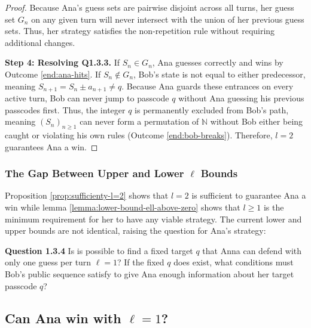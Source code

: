 \begin{proof}
Because Ana's guess sets are pairwise disjoint across all turns, her guess set $G_n$ on any given turn will never intersect with the union of her previous guess sets. Thus, her strategy satisfies the non-repetition rule without requiring additional changes.

\textbf{Step 4: Resolving Q1.3.3.} 
If $S_n \in G_n$, Ana guesses correctly and wins by Outcome \ref{end:ana-hits}. If $S_n \notin G_n$, Bob's state is not equal to either predecessor, meaning $S_{n+1} = S_n \pm a_{n+1} \neq q$. Because Ana guards these entrances on every active turn, Bob can never jump to passcode $q$ without Ana guessing his previous passcodes first. Thus, the integer $q$ is permanently excluded from Bob's path, meaning $(S_n)_{n \ge 1}$ can never form a permutation of $\mathbb{N}$ without Bob either being caught or violating his own rules (Outcome \ref{end:bob-breaks}). Therefore, $l=2$ guarantees Ana a win.
\end{proof}


\subsubsection*{The Gap Between Upper and Lower $\ell$ Bounds}
Proposition \ref{prop:sufficienty-l=2} shows that $l=2$ is sufficient to guarantee Ana a win while lemma \ref{lemma:lower-bound-ell-above-zero} shows that $l \ge 1$ is the minimum requirement for her to have any viable strategy. The current lower and upper bounds are not identical, raising the question for Ana's strategy:

\begin{questionbox}
\textbf{Question 1.3.4}
Is is possible to find a fixed target $q$ that Anna can defend with only one guess per turn $\ell =1$? If the fixed $q$ does exist, what conditions must Bob's public sequence satisfy to give Ana enough information about her target passcode $q$? 
\end{questionbox}

\subsection{Can Ana win with $\ell=1$?}

